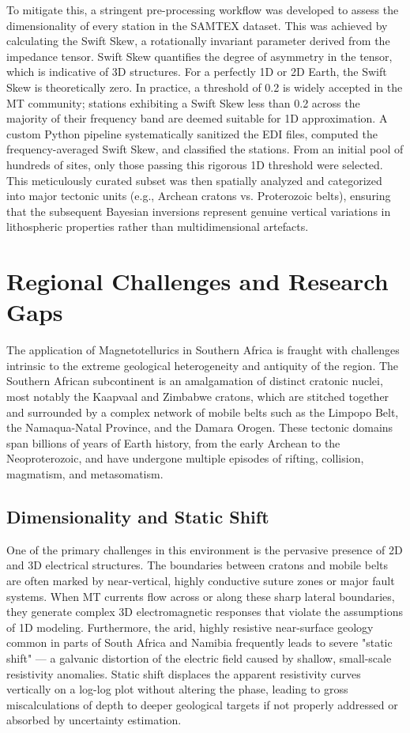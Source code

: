 To mitigate this, a stringent pre-processing workflow was developed to assess the dimensionality of every station in the SAMTEX dataset. This was achieved by calculating the Swift Skew, a rotationally invariant parameter derived from the impedance tensor. Swift Skew quantifies the degree of asymmetry in the tensor, which is indicative of 3D structures. For a perfectly 1D or 2D Earth, the Swift Skew is theoretically zero. In practice, a threshold of 0.2 is widely accepted in the MT community; stations exhibiting a Swift Skew less than 0.2 across the majority of their frequency band are deemed suitable for 1D approximation. A custom Python pipeline systematically sanitized the EDI files, computed the frequency-averaged Swift Skew, and classified the stations. From an initial pool of hundreds of sites, only those passing this rigorous 1D threshold were selected. This meticulously curated subset was then spatially analyzed and categorized into major tectonic units (e.g., Archean cratons vs. Proterozoic belts), ensuring that the subsequent Bayesian inversions represent genuine vertical variations in lithospheric properties rather than multidimensional artefacts.


\section{Regional Challenges and Research Gaps}

The application of Magnetotellurics in Southern Africa is fraught with challenges intrinsic to the extreme geological heterogeneity and antiquity of the region. The Southern African subcontinent is an amalgamation of distinct cratonic nuclei, most notably the Kaapvaal and Zimbabwe cratons, which are stitched together and surrounded by a complex network of mobile belts such as the Limpopo Belt, the Namaqua-Natal Province, and the Damara Orogen. These tectonic domains span billions of years of Earth history, from the early Archean to the Neoproterozoic, and have undergone multiple episodes of rifting, collision, magmatism, and metasomatism.

\subsection{Dimensionality and Static Shift}
One of the primary challenges in this environment is the pervasive presence of 2D and 3D electrical structures. The boundaries between cratons and mobile belts are often marked by near-vertical, highly conductive suture zones or major fault systems. When MT currents flow across or along these sharp lateral boundaries, they generate complex 3D electromagnetic responses that violate the assumptions of 1D modeling. Furthermore, the arid, highly resistive near-surface geology common in parts of South Africa and Namibia frequently leads to severe "static shift" — a galvanic distortion of the electric field caused by shallow, small-scale resistivity anomalies. Static shift displaces the apparent resistivity curves vertically on a log-log plot without altering the phase, leading to gross miscalculations of depth to deeper geological targets if not properly addressed or absorbed by uncertainty estimation.

